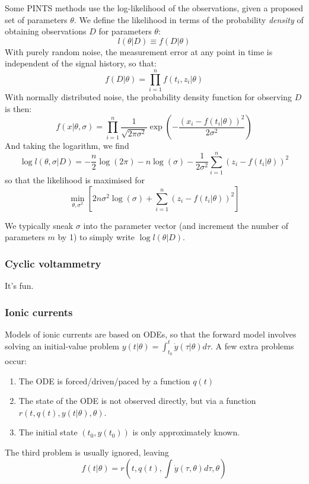 \documentclass[preprint,authoryear,12pt]{elsarticle}
\begin{document}
Some PINTS methods use the log-likelihood of the observations, given a proposed
 set of parameters $\theta$.
We define the likelihood in terms of the probability \emph{density} of
 obtaining observations $D$ for parameters $\theta$:
\begin{equation}
l(\theta|D) \equiv f(D|\theta)
\end{equation}
With purely random noise, the measurement error at any point in time is
 independent of the signal history, so that:
\begin{equation}
f(D|\theta) = \prod_{i=1}^{n} f(t_i,z_i|\theta)
\end{equation}
With normally distributed noise, the probability density function for
 observing $D$ is then:
\begin{equation}
f(x|\theta,\sigma) = \prod_{i=1}^{n} \frac{1}{\sqrt{2\pi\sigma^2}}
    \exp \left(
        -\frac{\left(x_i - f(t_i|\theta)\right)^2}{2\sigma^2}
    \right)
\end{equation}
And taking the logarithm, we find
\begin{equation}
\log l(\theta,\sigma|D) =
    - \frac{n}{2} \log(2\pi)
    - n \log(\sigma)
    - \frac{1}{2\sigma^2} \sum_{i=1}^n \left(z_i - f(t_i|\theta) \right)^2
\end{equation}
so that the likelihood is maximised for
\begin{equation}
\min_{ \theta, \sigma^2 }
    \left[
        2n\sigma^2 \log(\sigma)
        + \sum_{i=1}^n \left(z_i - f(t_i|\theta) \right)^2
    \right]
\end{equation}

We typically sneak $\sigma$ into the parameter vector (and increment the
 number of parameters $m$ by 1) to simply write $\log l(\theta|D)$.

\subsubsection{Cyclic voltammetry}

It's fun.
 

\subsubsection{Ionic currents}

Models of ionic currents are based on ODEs, so that the forward model involves
 solving an initial-value problem
 $y(t|\theta) = \int_{t_0}^t \dot{y}(\tau|\theta)d\tau$.
A few extra problems occur:
\begin{enumerate}
\item The ODE is forced/driven/paced by a function $q(t)$
\item The state of the ODE is not observed directly, but via a function
 $r(t, q(t), y(t|\theta), \theta)$.
\item The initial state $(t_0, y(t_0))$ is only approximately known.
\end{enumerate}
The third problem is usually ignored, leaving
\begin{equation}
f(t|\theta) = r(t, q(t), \int\dot{y}(\tau, \theta)d\tau, \theta)
\end{equation}
\end{document}
